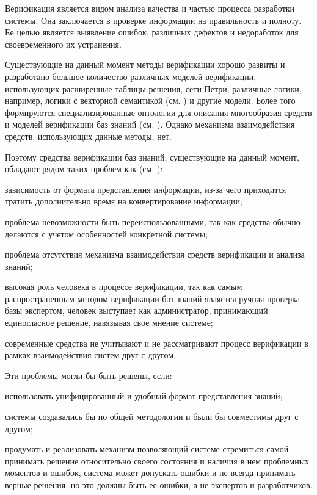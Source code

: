 Верификация является видом анализа качества и частью процесса разработки системы. Она заключается в проверке информации на правильность и полноту.
Ее целью является выявление ошибок, различных дефектов и недоработок для своевременного их устранения.

Существующие на данный момент методы верификации хорошо развиты и разработано большое количество различных моделей верификации, использующих расширенные таблицы решения, сети Петри, различные логики, например, логики с векторной семантикой (см. ) и другие модели. Более того формируются специализированные онтологии для описания многообразия средств и моделей верификации баз знаний (см. ). Однако механизма взаимодействия средств, использующих данные методы, нет.

Поэтому средства верификации баз знаний, существующие на данный момент, обладают рядом таких проблем как (см. ):
\begin{textitemize}
    \item зависимость от формата представления информации, из-за чего приходится тратить дополнительно время на конвертирование информации;
    \item проблема невозможности быть переиспользованными, так как средства обычно делаются с учетом особенностей конкретной системы;
    \item проблема отсутствия механизма взаимодействия средств верификации и анализа знаний;
    \item высокая роль человека в процессе верификации, так как самым распространенным методом верификации баз знаний является ручная проверка базы экспертом, человек выступает как администратор, принимающий единогласное решение, навязывая свое мнение системе;
    \item современные средства не учитывают и не рассматривают процесс верификации в рамках взаимодействия систем друг с другом.
\end{textitemize}

Эти проблемы могли бы быть решены, если:
\begin{textitemize}
    \item использовать унифицированный и удобный формат представления знаний;
    \item системы создавались бы по общей методологии и были бы совместимы друг с другом;
    \item продумать и реализовать механизм позволяющий системе стремиться самой принимать решение относительно своего состояния и наличия в нем проблемных моментов и ошибок, система может допускать ошибки и не всегда принимать верные решения, но это должны быть ее ошибки, а не экспертов и разработчиков.
\end{textitemize}

